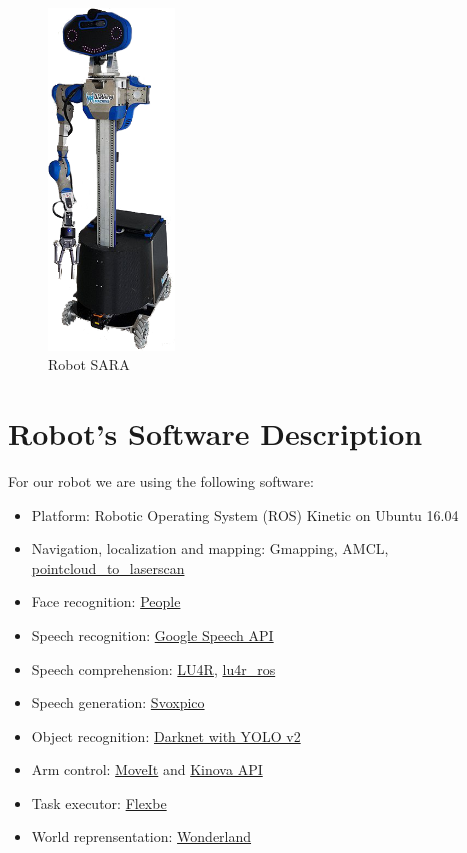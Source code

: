 \begin{figure}
	\centering
	\includegraphics[width=0.30\textwidth]{images/sara_2.png}
	\caption{Robot SARA}
\end{figure}
\section*{Robot's Software Description}

For our robot we are using the following software:

\begin{itemize}
	\item Platform: Robotic Operating System (ROS) Kinetic on Ubuntu 16.04
	\item Navigation, localization and mapping: Gmapping, AMCL, \href{http://wiki.ros.org/pointcloud_to_laserscan}{pointcloud\_to\_laserscan}
	\item Face recognition: \href{http://wiki.ros.org/people}{People}
	\item Speech recognition: \href{https://github.com/WalkingMachine/lab_ros_speech_to_text}{Google Speech API}
	\item Speech comprehension: \href{http://sag.art.uniroma2.it/lu4r.html}{LU4R}, \href{https://github.com/WalkingMachine/lu4r_ros}{lu4r\_ros}
	\item Speech generation: \href{https://doc.ubuntu-fr.org/svoxpico}{Svoxpico}
	\item Object recognition: \href{https://github.com/WalkingMachine/wm_darknet}{Darknet with YOLO v2 }
	\item Arm control: \href{http://wiki.ros.org/moveit}{MoveIt} and \href{https://github.com/Kinovarobotics/kinova-ros}{Kinova API}
	\item Task executor: \href{http://wiki.ros.org/flexbe}{Flexbe} 
	\item World reprensentation: \href{http://github.com/walkingmachine/wonderland}{Wonderland}
\end{itemize}